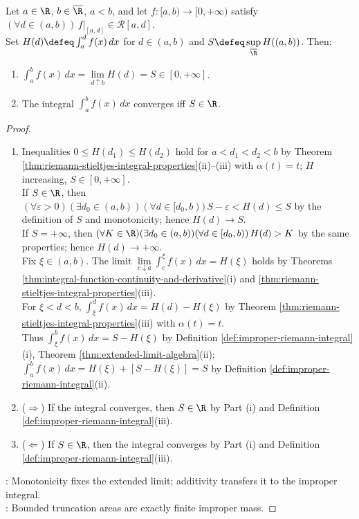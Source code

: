 \begin{theorem} \label{thm:nonnegative-improper-integral-supremum} \\
Let $a\in\R$, $b\in\overline{\R}$, $a<b$, and let $f:[a,b)\to[0,+\infty)$ satisfy $(\forall d\in(a,b))\,f|_{[a,d]}\in\mathcal{R}[a,d]$.\\
Set $H(d)\defeq\int_a^d f(x)\,dx$ for $d\in(a,b)$ and $S\defeq\sup\limits_{\overline{\R}}H((a,b))$. Then:
\begin{enumerate}[label=(\roman*)]
\setlength{\itemsep}{0pt}
\item $\int_a^b f(x)\,dx=\lim\limits_{d\uparrow b}H(d)=S\in[0,+\infty]$.
\item The integral $\int_a^b f(x)\,dx$ converges iff $S\in\R$.
\end{enumerate}
\begin{proof}
\begin{enumerate}[label=(\roman*)]
\setlength{\itemsep}{0pt}
\item[$(i)$] Inequalities $0\leq H(d_1)\leq H(d_2)$ hold for $a<d_1<d_2<b$ by Theorem \ref{thm:riemann-stieltjes-integral-properties}(ii)--(iii) with $\alpha(t)=t$; $H$ increasing, $S\in[0,+\infty]$.\\
If $S\in\R$, then $(\forall\varepsilon>0)(\exists d_0\in(a,b))(\forall d\in[d_0,b))\,S-\varepsilon<H(d)\leq S$ by the definition of $S$ and monotonicity; hence $H(d)\to S$.\\
If $S=+\infty$, then $(\forall K\in\R)(\exists d_0\in(a,b))(\forall d\in[d_0,b))\,H(d)>K$ by the same properties; hence $H(d)\to+\infty$.\\
Fix $\xi\in(a,b)$. The limit $\lim\limits_{c\downarrow a}\int_c^\xi f(x)\,dx=H(\xi)$ holds by Theorems \ref{thm:integral-function-continuity-and-derivative}(i) and \ref{thm:riemann-stieltjes-integral-properties}(iii).\\
For $\xi<d<b$, $\int_\xi^d f(x)\,dx=H(d)-H(\xi)$ by Theorem \ref{thm:riemann-stieltjes-integral-properties}(iii) with $\alpha(t)=t$.\\
Thus $\int_\xi^b f(x)\,dx=S-H(\xi)$ by Definition \ref{def:improper-riemann-integral}(i),  Theorem \ref{thm:extended-limit-algebra}(ii); $\int_a^b f(x)\,dx=H(\xi)+[S-H(\xi)]=S$ by Definition \ref{def:improper-riemann-integral}(ii).
\item[$(ii)$] ($\Rightarrow$) If the integral converges, then $S\in\R$ by Part (i) and Definition \ref{def:improper-riemann-integral}(iii).
\item[$(ii)$] ($\Leftarrow$) If $S\in\R$, then the integral converges by Part (i) and Definition \ref{def:improper-riemann-integral}(iii).
\end{enumerate}
: Monotonicity fixes the extended limit; additivity transfers it to the improper integral.\\
: Bounded truncation areas are exactly finite improper mass.
\end{proof}
\end{theorem}

